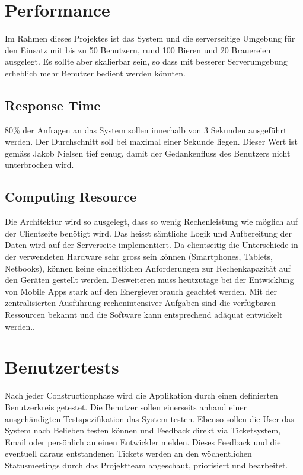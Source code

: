 \documentclass[10pt,a4paper]{scrartcl}
\begin{document}
\section{Performance}

Im Rahmen dieses Projektes ist das System und die serverseitige Umgebung für den Einsatz mit  bis zu 50 Benutzern, rund 100 Bieren und 20 Brauereien ausgelegt. Es sollte aber skalierbar sein, so dass mit besserer Serverumgebung erheblich mehr Benutzer bedient werden könnten.

	\subsection{Response Time}

	80\% der Anfragen an das System sollen innerhalb von 3 Sekunden ausgeführt werden.
	Der Durchschnitt soll bei maximal einer Sekunde liegen. Dieser Wert ist gemäss Jakob Nielsen tief genug, damit der Gedankenfluss des Benutzers nicht unterbrochen wird\cite{nielsen1993usability}.

	\subsection{Computing Resource}

	Die Architektur wird so ausgelegt, dass so wenig Rechenleistung wie möglich auf der Clientseite benötigt wird. Das heisst sämtliche Logik und Aufbereitung der Daten wird auf der Serverseite implementiert. Da clientseitig die Unterschiede in der verwendeten Hardware sehr gross sein können (Smartphones, Tablets, Netbooks), können keine einheitlichen Anforderungen zur Rechenkapazität auf den Geräten gestellt werden. Desweiteren muss heutzutage bei der Entwicklung von Mobile Apps stark auf den Energieverbrauch geachtet werden. Mit der zentralisierten Ausführung rechenintensiver Aufgaben sind die verfügbaren Ressourcen bekannt und die Software kann entsprechend adäquat entwickelt werden..


\section{Benutzertests}
\label{sec:benutzertests}

Nach jeder Constructionphase wird die Applikation durch einen definierten Benutzerkreis getestet. Die Benutzer sollen einerseits anhand einer ausgehändigten Testspezifikation das System testen. Ebenso sollen die User das System nach Belieben testen können und Feedback direkt via Ticketsystem, Email oder persönlich an einen Entwickler melden. Dieses Feedback und die eventuell daraus entstandenen Tickets werden an den wöchentlichen Statusmeetings durch das Projektteam angeschaut, priorisiert und bearbeitet.
\end{document}
